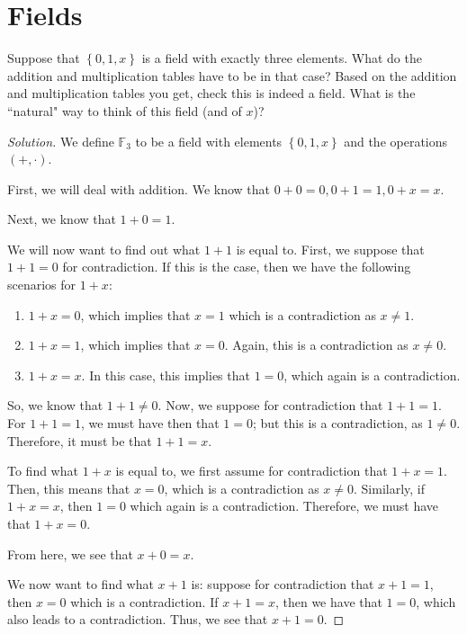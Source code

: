 \documentclass{article}
\newenvironment{solution}{\begin{proof}[Solution]}{\end{proof}}
\begin{document}
\newpage

\section{Fields}
\begin{hw}
	Suppose that $\left\{  0, 1, x\right\}$ is a field with exactly three elements. What do the addition and multiplication tables have to be in that case? Based on the addition and multiplication tables you get, check this is
	indeed a field. What is the ``natural" way to think of this field (and of $x$)?
\end{hw}

\begin{solution}
	We define $\mathbb{F}_{3}$ to be a field with elements $\left\{  0, 1, x\right\}$ and the operations $(+, \cdot)$.
	
	First, we will deal with addition. We know that $0 + 0 = 0, 0 + 1 = 1, 0 + x = x$. 
	
	Next, we know that $1 + 0 = 1$. 

	We will now want to find out what $1 + 1$ is equal to. First, we suppose that $1 + 1 = 0$ for contradiction. If this is the case, then we have the following scenarios for $1 + x$:
	\begin{enumerate}
		\item $1 + x = 0$, which implies that $x = 1$ which is a contradiction as $x \not= 1$.
		
		\item $1 + x = 1$, which implies that $x = 0$. Again, this is a contradiction as $x \not= 0$.
		
		\item $1 + x = x$. In this case, this implies that $1 = 0$, which again is a contradiction.
	\end{enumerate}
	
	 So, we know that $1 + 1 \not= 0$. Now, we suppose for contradiction that $1 + 1 = 1$. For $1 + 1 = 1$, we must have then that $1 = 0$; but this is a contradiction, as $1 \not= 0$. Therefore, it must be that $1 + 1 = x$.
	 
	 To find what $1 + x$ is equal to, we first assume for contradiction that $1 + x = 1$. Then, this means that $x = 0$, which is a contradiction as $x \not= 0$. Similarly, if $1 + x = x$, then $1 = 0$ which again is a contradiction. Therefore, we must have that $1 + x = 0$.
	
	From here, we see that $x + 0 = x$. 
	
	We now want to find what $x + 1$ is: suppose for contradiction that $x + 1 = 1$, then $x = 0$ which is a contradiction. If $x+1 = x$, then we have that $1 = 0$, which also leads to a contradiction. Thus, we see that $x + 1 = 0$.
	

\end{solution}
\end{document}
